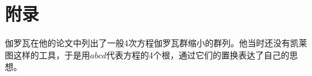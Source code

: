 \documentclass[b5paper]{ctexart}
\begin{document}


\section{附录}
伽罗瓦在他的论文中列出了一般4次方程伽罗瓦群缩小的群列。他当时还没有凯莱图这样的工具，于是用$abcd$代表方程的4个根，通过它们的置换表达了自己的思想。
\end{document}
